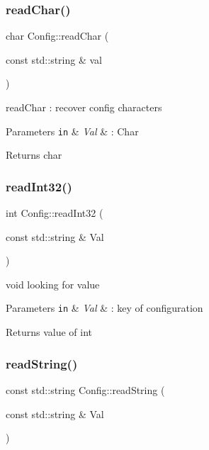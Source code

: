 \subsubsection{\texorpdfstring{read\+Char()}{readChar()}}
{\footnotesize\ttfamily char Config\+::read\+Char (\begin{DoxyParamCaption}\item[{const std\+::string \&}]{val }\end{DoxyParamCaption})}



read\+Char \+: recover config characters 


\begin{DoxyParams}[1]{Parameters}
\mbox{\tt in}  & {\em Val} & \+: Char \\
\hline
\end{DoxyParams}
\begin{DoxyReturn}{Returns}
char 
\end{DoxyReturn}
\mbox{\label{class_config_aaf4d21cf2d2c0c2ca7666c2c360f70b6}} 
\subsubsection{\texorpdfstring{read\+Int32()}{readInt32()}}
{\footnotesize\ttfamily int Config\+::read\+Int32 (\begin{DoxyParamCaption}\item[{const std\+::string \&}]{Val }\end{DoxyParamCaption})}



void looking for value 


\begin{DoxyParams}[1]{Parameters}
\mbox{\tt in}  & {\em Val} & \+: key of configuration \\
\hline
\end{DoxyParams}
\begin{DoxyReturn}{Returns}
value of int 
\end{DoxyReturn}
\mbox{\label{class_config_af6f437a43639fbcaaaa39ad5e4d3cba0}} 
\subsubsection{\texorpdfstring{read\+String()}{readString()}}
{\footnotesize\ttfamily const std\+::string Config\+::read\+String (\begin{DoxyParamCaption}\item[{const std\+::string \&}]{Val }\end{DoxyParamCaption})}



